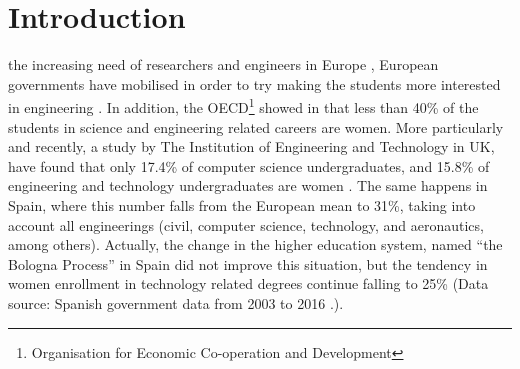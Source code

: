 \documentclass[journal,transmag]{IEEEtran}
\begin{document}
\IEEEdisplaynontitleabstractindextext







%
\IEEEpeerreviewmaketitle

\section{Introduction}
\label{sec:intro}

 the increasing need of researchers and engineers in Europe \cite{gago2004europe}, European governments have mobilised in order to try making the students more interested in engineering \cite{Kearney2014}. In addition, the OECD\footnote{Organisation for Economic Co-operation and Development} showed in \cite{OECD2006} that less than 40\% of the students in science and engineering related careers are women. More particularly and recently, a study by The Institution of Engineering and Technology in UK, have found that only 17.4\% of computer science undergraduates, and 15.8\% of engineering and technology undergraduates are women \cite{IET::stats}. The same happens in Spain, where this number falls from the European mean to 31\%, taking into account all engineerings (civil, computer science, technology, and aeronautics, among others). Actually, the change in the higher education system, named ``the Bologna Process'' in Spain \cite{wagenaar2008universities} did not improve this situation, but the tendency in women enrollment in technology related degrees continue falling to 25\% (Data source: Spanish government data from 2003 to 2016 \cite{datos::uni}.).
\end{document}
